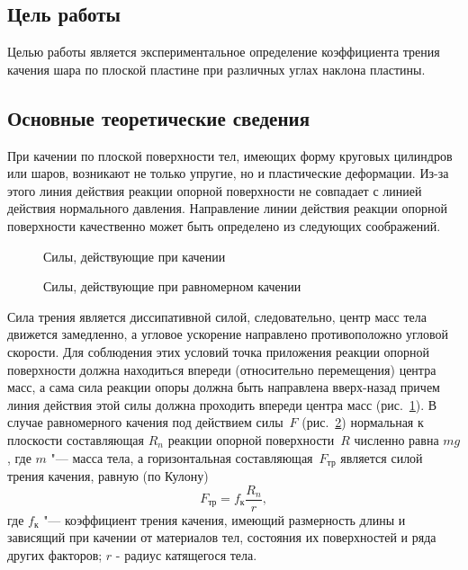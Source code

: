 \documentclass[a4paper, 12pt]{extarticle}
\begin{document}
\MTDTitlePage
\MTDInfoPage

\setcounter{section}{8}

\subsection{Цель работы}
Целью работы является экспериментальное определение коэффициента трения качения шара по плоской пластине при различных углах наклона пластины. 

\subsection{Основные теоретические сведения}
При качении по плоской поверхности тел, имеющих форму круговых цилиндров или шаров, возникают не только упругие, но и пластические деформации. Из-за этого линия действия реакции опорной поверхности не совпадает с линией действия нормального давления. Направление линии  действия реакции опорной поверхности качественно может быть определено из следующих соображений. 

\begin{figure}[h]
\begin{center}
\end{center}
\caption{Силы, действующие при качении \label{fig:m8-rolling}}
\end{figure}

\begin{figure}[h]
\begin{center}
\end{center}
\caption{Силы, действующие при равномерном качении \label{fig:m8-uniform-rolling}}
\end{figure}

Сила трения является диссипативной силой, следовательно, центр масс тела движется замедленно, а угловое ускорение направлено противоположно угловой скорости. Для соблюдения этих условий точка приложения реакции опорной  поверхности должна находиться впереди (относительно перемещения) центра масс, а сама сила реакции опоры должна быть направлена вверх-назад причем линия действия этой силы должна проходить впереди центра масс (рис.~\ref{fig:m8-rolling}). В случае равномерного качения под действием силы~$F$ (рис.~\ref{fig:m8-uniform-rolling}) нормальная к плоскости составляющая $R_n$ реакции опорной поверхности~$R$ численно равна $mg$, где $m$ "--- масса тела, а горизонтальная составляющая~$F_\text{тр}$ является силой трения качения, равную (по Кулону) %
\begin{equation}
\label{eq:m8-rolling-resistance}
F_\text{тр} = f_\text{к} \frac{R_n}{r}, %
\end{equation}
где $f_\text{к}$ "--- коэффициент трения качения, имеющий размерность длины и зависящий при качении от материалов тел, состояния их поверхностей и ряда других факторов; 
$r$ - радиус катящегося тела.
\end{document}
